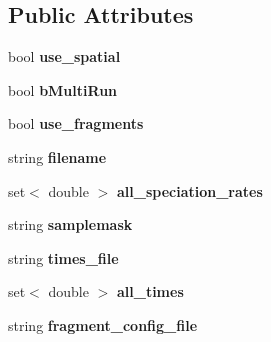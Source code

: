 \subsection*{Public Attributes}
\begin{DoxyCompactItemize}
\item 
bool {\bfseries use\+\_\+spatial}\hypertarget{struct_spec_sim_parameters_a7baa6db5f411b4fdb9dd5fae0fd25a26}{}\label{struct_spec_sim_parameters_a7baa6db5f411b4fdb9dd5fae0fd25a26}

\item 
bool {\bfseries b\+Multi\+Run}\hypertarget{struct_spec_sim_parameters_a7ca69d2db2aaf8cdcc62b1ec854f72bf}{}\label{struct_spec_sim_parameters_a7ca69d2db2aaf8cdcc62b1ec854f72bf}

\item 
bool {\bfseries use\+\_\+fragments}\hypertarget{struct_spec_sim_parameters_ae2a8648d57c4b7df097bd450ab868e64}{}\label{struct_spec_sim_parameters_ae2a8648d57c4b7df097bd450ab868e64}

\item 
string {\bfseries filename}\hypertarget{struct_spec_sim_parameters_a39beb88bb0ce36265bb0b8c8468cbe48}{}\label{struct_spec_sim_parameters_a39beb88bb0ce36265bb0b8c8468cbe48}

\item 
set$<$ double $>$ {\bfseries all\+\_\+speciation\+\_\+rates}\hypertarget{struct_spec_sim_parameters_aca1ed096bc62ab6914b34e12784daea1}{}\label{struct_spec_sim_parameters_aca1ed096bc62ab6914b34e12784daea1}

\item 
string {\bfseries samplemask}\hypertarget{struct_spec_sim_parameters_add68fe2a48b1d80173c5066bf9cd0f6c}{}\label{struct_spec_sim_parameters_add68fe2a48b1d80173c5066bf9cd0f6c}

\item 
string {\bfseries times\+\_\+file}\hypertarget{struct_spec_sim_parameters_a83a3ce34449db0152e0012838c0ac3a6}{}\label{struct_spec_sim_parameters_a83a3ce34449db0152e0012838c0ac3a6}

\item 
set$<$ double $>$ {\bfseries all\+\_\+times}\hypertarget{struct_spec_sim_parameters_ad9441471fbf455638a9598ba8aefe63e}{}\label{struct_spec_sim_parameters_ad9441471fbf455638a9598ba8aefe63e}

\item 
string {\bfseries fragment\+\_\+config\+\_\+file}\hypertarget{struct_spec_sim_parameters_adef81f827b1402d19f318c66f295c62a}{}\label{struct_spec_sim_parameters_adef81f827b1402d19f318c66f295c62a}


\end{DoxyCompactItemize}
